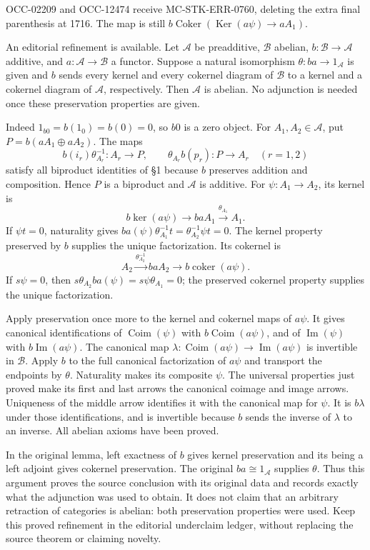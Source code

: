 \documentclass[11pt]{article}
\begin{document}
OCC-02209 and OCC-12474 receive MC-STK-ERR-0760, deleting the extra final parenthesis at 1716. The map is still \(b\operatorname{Coker}(\operatorname{Ker}(a\psi)\to aA_1)\).

An editorial refinement is available. Let \(\mathcal A\) be preadditive, \(\mathcal B\) abelian, \(b:\mathcal B\to\mathcal A\) additive, and \(a:\mathcal A\to\mathcal B\) a functor. Suppose a natural isomorphism \(\theta:ba\to1_{\mathcal A}\) is given and \(b\) sends every kernel and every cokernel diagram of \(\mathcal B\) to a kernel and a cokernel diagram of \(\mathcal A\), respectively. Then \(\mathcal A\) is abelian. No adjunction is needed once these preservation properties are given.

Indeed \(1_{b0}=b(1_0)=b(0)=0\), so \(b0\) is a zero object. For \(A_1,A_2\in\mathcal A\), put \(P=b(aA_1\oplus aA_2)\). The maps \[
b(i_r)\theta_{A_r}^{-1}:A_r\to P,\qquad
\theta_{A_r}b(p_r):P\to A_r\quad(r=1,2)
\] satisfy all biproduct identities of §1 because \(b\) preserves addition and composition. Hence \(P\) is a biproduct and \(\mathcal A\) is additive. For \(\psi:A_1\to A_2\), its kernel is \[
b\ker(a\psi)\longrightarrow baA_1\xrightarrow{\theta_{A_1}}A_1.
\] If \(\psi t=0\), naturality gives \(ba(\psi)\theta_{A_1}^{-1}t=\theta_{A_2}^{-1}\psi t=0\). The kernel property preserved by \(b\) supplies the unique factorization. Its cokernel is \[
A_2\xrightarrow{\theta_{A_2}^{-1}}baA_2
\longrightarrow b\operatorname{coker}(a\psi).
\] If \(s\psi=0\), then \(s\theta_{A_2}ba(\psi)=s\psi\theta_{A_1}=0\); the preserved cokernel property supplies the unique factorization.

Apply preservation once more to the kernel and cokernel maps of \(a\psi\). It gives canonical identifications of \(\operatorname{Coim}(\psi)\) with \(b\operatorname{Coim}(a\psi)\), and of \(\operatorname{Im}(\psi)\) with \(b\operatorname{Im}(a\psi)\). The canonical map \(\lambda:\operatorname{Coim}(a\psi)\to\operatorname{Im}(a\psi)\) is invertible in \(\mathcal B\). Apply \(b\) to the full canonical factorization of \(a\psi\) and transport the endpoints by \(\theta\). Naturality makes its composite \(\psi\). The universal properties just proved make its first and last arrows the canonical coimage and image arrows. Uniqueness of the middle arrow identifies it with the canonical map for \(\psi\). It is \(b\lambda\) under those identifications, and is invertible because \(b\) sends the inverse of \(\lambda\) to an inverse. All abelian axioms have been proved.

In the original lemma, left exactness of \(b\) gives kernel preservation and its being a left adjoint gives cokernel preservation. The original \(ba\cong1_{\mathcal A}\) supplies \(\theta\). Thus this argument proves the source conclusion with its original data and records exactly what the adjunction was used to obtain. It does not claim that an arbitrary retraction of categories is abelian: both preservation properties were used. Keep this proved refinement in the editorial underclaim ledger, without replacing the source theorem or claiming novelty.
\end{document}
